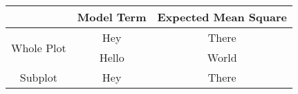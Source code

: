 \begin{tabular}{c c c}
    & \textbf{Model Term} & \textbf{Expected Mean Square}  \\
    \hline
     \multirow{ 2}{*}{Whole Plot}& Hey & There\\
     & Hello & World \\
     \hline
     \multirow{ 2}{*}{Subplot}& Hey & There
\end{tabular}\\